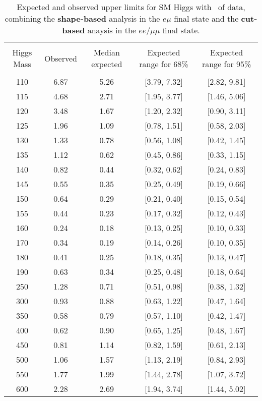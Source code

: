 \begin{table}[hbp!]
\begin{center}
\caption{\fixme Expected and observed upper limits for SM Higgs using the
  {\bf cut-based} analysis with \intlumiEightTeV\ of data.}
\label{tab:cutbase_uls}
\end{center}
\begin{center}
\begin{tabular}{c c c c c}
\hline
\vspace{-3mm} && \\
 Higgs Mass & Observed  & Median expected & Expected range for 68\% & Expected range for 95\%   \\
\vspace{-3mm} && \\
\hline
110 & 6.87 & 5.26 & [3.79, 7.32] & [2.82, 9.81] \\
115 & 4.68 & 2.71 & [1.95, 3.77] & [1.46, 5.06] \\
120 & 3.48 & 1.67 & [1.20, 2.32] & [0.90, 3.11] \\
125 & 1.96 & 1.09 & [0.78, 1.51] & [0.58, 2.03] \\
130 & 1.33 & 0.78 & [0.56, 1.08] & [0.42, 1.45] \\
135 & 1.12 & 0.62 & [0.45, 0.86] & [0.33, 1.15] \\
140 & 0.82 & 0.44 & [0.32, 0.62] & [0.24, 0.83] \\
145 & 0.55 & 0.35 & [0.25, 0.49] & [0.19, 0.66] \\
150 & 0.64 & 0.29 & [0.21, 0.40] & [0.15, 0.54] \\
155 & 0.44 & 0.23 & [0.17, 0.32] & [0.12, 0.43] \\
160 & 0.24 & 0.18 & [0.13, 0.25] & [0.10, 0.33] \\
170 & 0.34 & 0.19 & [0.14, 0.26] & [0.10, 0.35] \\
180 & 0.41 & 0.25 & [0.18, 0.35] & [0.13, 0.47] \\
190 & 0.63 & 0.34 & [0.25, 0.48] & [0.18, 0.64] \\
250 & 1.28 & 0.71 & [0.51, 0.98] & [0.38, 1.32] \\
300 & 0.93 & 0.88 & [0.63, 1.22] & [0.47, 1.64] \\
350 & 0.58 & 0.79 & [0.57, 1.10] & [0.42, 1.47] \\
400 & 0.62 & 0.90 & [0.65, 1.25] & [0.48, 1.67] \\
450 & 0.81 & 1.14 & [0.82, 1.59] & [0.61, 2.13] \\
500 & 1.06 & 1.57 & [1.13, 2.19] & [0.84, 2.93] \\
550 & 1.77 & 1.99 & [1.44, 2.78] & [1.07, 3.72] \\
600 & 2.28 & 2.69 & [1.94, 3.74] & [1.44, 5.02] \\
\hline
\end{tabular}
\caption{\fixme Expected and observed upper limits for SM Higgs with \intlumiEightTeV\ of data, 
  combining the {\bf shape-based} analysis in the $e\mu$ final state and the 
  {\bf cut-based} anaysis in the $ee/\mu\mu$ final state. }
\label{tab:mvabase_uls}
\end{center}
\end{table}

